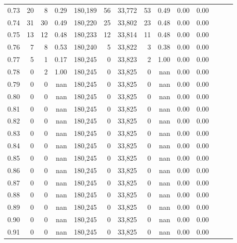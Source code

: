 \begin{tabular}{rrrrrrrrrrrrrr}
0.73 &     20 &      8 &  0.29 &  180,189 &       56 &  33,772 &      53 &  0.49 &  0.00 &      0.00 \\
0.74 &     31 &     30 &  0.49 &  180,220 &       25 &  33,802 &      23 &  0.48 &  0.00 &      0.00 \\
0.75 &     13 &     12 &  0.48 &  180,233 &       12 &  33,814 &      11 &  0.48 &  0.00 &      0.00 \\
0.76 &      7 &      8 &  0.53 &  180,240 &        5 &  33,822 &       3 &  0.38 &  0.00 &      0.00 \\
0.77 &      5 &      1 &  0.17 &  180,245 &        0 &  33,823 &       2 &  1.00 &  0.00 &      0.00 \\
0.78 &      0 &      2 &  1.00 &  180,245 &        0 &  33,825 &       0 &   nan &  0.00 &      0.00 \\
0.79 &      0 &      0 &   nan &  180,245 &        0 &  33,825 &       0 &   nan &  0.00 &      0.00 \\
0.80 &      0 &      0 &   nan &  180,245 &        0 &  33,825 &       0 &   nan &  0.00 &      0.00 \\
0.81 &      0 &      0 &   nan &  180,245 &        0 &  33,825 &       0 &   nan &  0.00 &      0.00 \\
0.82 &      0 &      0 &   nan &  180,245 &        0 &  33,825 &       0 &   nan &  0.00 &      0.00 \\
0.83 &      0 &      0 &   nan &  180,245 &        0 &  33,825 &       0 &   nan &  0.00 &      0.00 \\
0.84 &      0 &      0 &   nan &  180,245 &        0 &  33,825 &       0 &   nan &  0.00 &      0.00 \\
0.85 &      0 &      0 &   nan &  180,245 &        0 &  33,825 &       0 &   nan &  0.00 &      0.00 \\
0.86 &      0 &      0 &   nan &  180,245 &        0 &  33,825 &       0 &   nan &  0.00 &      0.00 \\
0.87 &      0 &      0 &   nan &  180,245 &        0 &  33,825 &       0 &   nan &  0.00 &      0.00 \\
0.88 &      0 &      0 &   nan &  180,245 &        0 &  33,825 &       0 &   nan &  0.00 &      0.00 \\
0.89 &      0 &      0 &   nan &  180,245 &        0 &  33,825 &       0 &   nan &  0.00 &      0.00 \\
0.90 &      0 &      0 &   nan &  180,245 &        0 &  33,825 &       0 &   nan &  0.00 &      0.00 \\
0.91 &      0 &      0 &   nan &  180,245 &        0 &  33,825 &       0 &   nan &  0.00 &      0.00 \\

\end{tabular}
